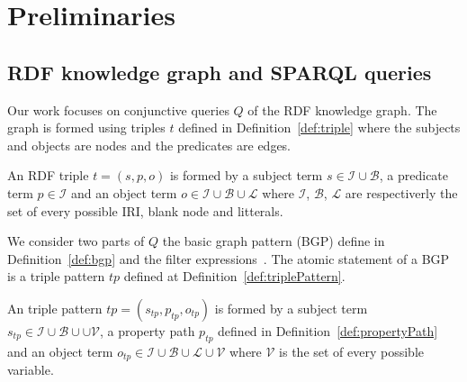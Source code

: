 \section{Preliminaries}





\subsection{RDF knowledge graph and SPARQL queries}
Our work focuses on conjunctive queries $Q$ of the RDF knowledge graph.
The graph is formed using triples $t$ defined in Definition~\ref{def:triple} where the subjects and objects are nodes and the predicates are edges.

\begin{definition}\label{def:triple}
    An RDF triple $t = (s,p,o)$ is formed by a  subject term $s \in \mathcal{I} \cup \mathcal{B}$, a predicate term  $p \in \mathcal{I}$ and an object term $o \in \mathcal{I} \cup \mathcal{B} \cup \mathcal{L}$
    where $\mathcal{I}$, $\mathcal{B}$, $\mathcal{L}$ are respectiverly the set of every possible IRI, blank node and litterals.
\end{definition}

We consider two parts of $Q$ the basic graph pattern (BGP) define in Definition~\ref{def:bgp} and the filter expressions~.
The atomic statement of a BGP is a triple pattern $tp$ defined at Definition~\ref{def:triplePattern}.

\begin{definition}\label{def:triplePattern}
    An triple pattern $tp = (s_{tp},p_{tp},o_{tp})$ is formed by a subject term $s_{tp} \in \mathcal{I} \cup \mathcal{B} \cup \cup \mathcal{V}$, 
    a property path  $p_{tp}$ defined in Definition~\ref{def:propertyPath} and an object term  $o_{tp} \in \mathcal{I} \cup \mathcal{B} \cup \mathcal{L} \cup \mathcal{V}$ 
    where $\mathcal{V}$ is the set of every possible variable. 
\end{definition}

